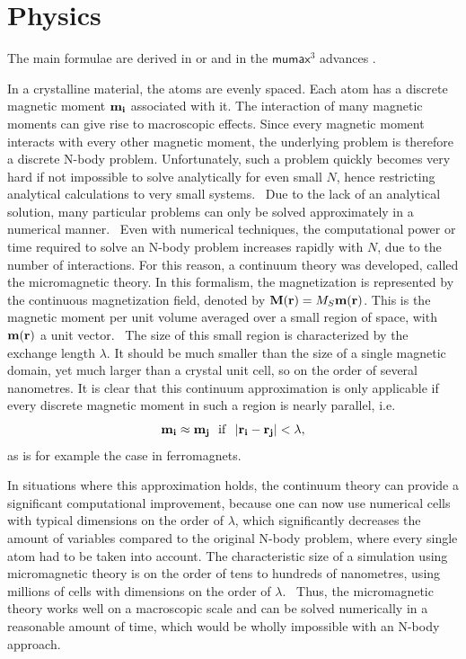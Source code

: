 \documentclass[10pt,a4paper]{article}
\newcommand{\mumax}{$\mathsf{mumax}^3$}
\begin{document}
\section{Physics}
The main formulae are derived in \cite{abert2013discrete} or \cite{NML_Carlton} and in the \mumax{} advances \cite{MuMax3_advances}. \par
In a crystalline material, the atoms are evenly spaced. Each atom has a discrete magnetic moment $\vb{m_i}$ associated with it. The interaction of many magnetic moments can give rise to macroscopic effects. Since every magnetic moment interacts with every other magnetic moment, the underlying problem is therefore a discrete N-body problem. Unfortunately, such a problem quickly becomes very hard if not impossible to solve analytically for even small $N$, hence restricting analytical calculations to very small systems.~\cite{abert2013discrete} Due to the lack of an analytical solution, many particular problems can only be solved approximately in a numerical manner.~\cite{abert2013discrete} Even with numerical techniques, the computational power or time required to solve an N-body problem increases rapidly with $N$, due to the number of interactions. For this reason, a continuum theory was developed, called the micromagnetic theory. In this formalism, the magnetization is represented by the continuous magnetization field, denoted by $\vb{M}(\vb{r}) = M_S \vb{m}(\vb{r})$. This is the magnetic moment per unit volume averaged over a small region of space, with $\vb{m}(\vb{r})$ a unit vector.~\cite{Gilbert1956}
The size of this small region is characterized by the exchange length $\lambda$. It should be much smaller than the size of a single magnetic domain, yet much larger than a crystal unit cell, so on the order of several nanometres. It is clear that this continuum approximation is only applicable if every discrete magnetic moment in such a region is nearly parallel, i.e.
\begin{equation}
    \vb{m_i} \approx \vb{m_j}~~\mathrm{if}~~\abs{\vb{r_i} - \vb{r_j}} < \lambda \mathrm{,}
\end{equation}
as is for example the case in ferromagnets. \par
In situations where this approximation holds, the continuum theory can provide a significant computational improvement, because one can now use numerical cells with typical dimensions on the order of $\lambda$, which significantly decreases the amount of variables compared to the original N-body problem, where every single atom had to be taken into account. The characteristic size of a simulation using micromagnetic theory is on the order of tens to hundreds of nanometres, using millions of cells with dimensions on the order of $\lambda$.~\cite{abert2013discrete} Thus, the micromagnetic theory works well on a macroscopic scale and can be solved numerically in a reasonable amount of time, which would be wholly impossible with an N-body approach.
\end{document}
